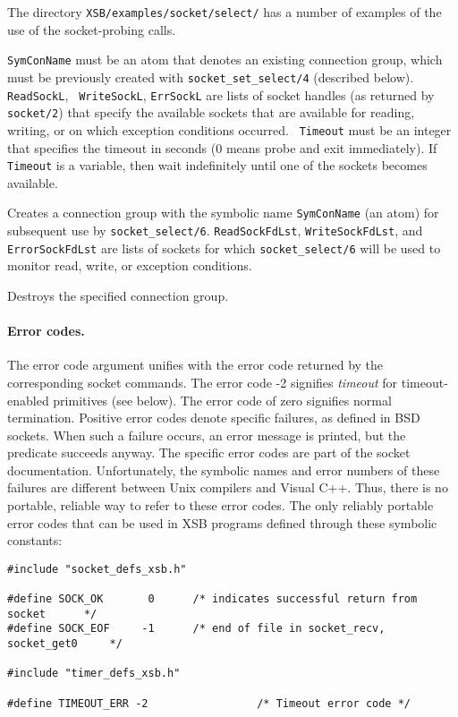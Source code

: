 The directory {\tt XSB/examples/socket/select/} has a number of examples of
the use of the socket-probing calls.
\begin{description}
  {\tt SymConName} must be an atom that
  denotes an existing connection group, which must be previously created with
  {\tt socket\_set\_select/4} (described below). {\tt ReadSockL}, {\tt
    WriteSockL}, {\tt ErrSockL} are lists of socket handles (as returned by
  {\tt socket/2}) that specify the available sockets that are available for
  reading, writing, or on which exception conditions occurred.  {\tt
    Timeout} must be an integer that specifies the timeout in seconds (0
  means probe and exit immediately). If {\tt Timeout} is a variable, then
  wait indefinitely until one of the sockets becomes available.

Creates a connection group with the symbolic name {\tt SymConName}
(an atom) for subsequent use by {\tt socket\_select/6}.
{\tt ReadSockFdLst}, {\tt WriteSockFdLst}, and {\tt ErrorSockFdLst} are
lists of sockets for which {\tt socket\_select/6} will be used to monitor read,
write, or exception conditions.

Destroys the specified connection group.

\end{description}


\paragraph{Error codes.}
The error code argument unifies with the error code returned by the
corresponding socket commands. The error code -2 signifies
\emph{timeout} for timeout-enabled primitives (see below). The error code
of zero signifies normal termination. Positive error codes denote specific
failures, as defined in BSD sockets. When such a failure occurs, an error
message is printed, but the predicate succeeds anyway. The specific error
codes are part of the socket documentation. Unfortunately, the symbolic
names and error numbers of these failures are different between Unix
compilers and Visual C++. Thus, there is no portable, reliable way to refer
to these error codes. The only reliably portable error codes that can be 
used in XSB programs defined through these symbolic constants:
\begin{verbatim}
#include "socket_defs_xsb.h"  

#define SOCK_OK       0      /* indicates successful return from socket      */
#define SOCK_EOF     -1      /* end of file in socket_recv, socket_get0     */

#include "timer_defs_xsb.h"

#define TIMEOUT_ERR -2                 /* Timeout error code */
\end{verbatim}

